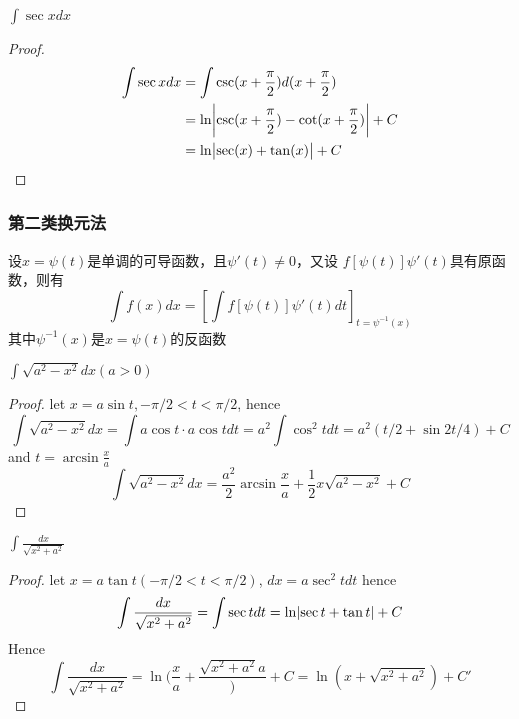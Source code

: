 \documentclass[11pt]{article}
\begin{document}
\begin{proposition}[]
\(\int\sec xdx\)
\end{proposition}

\begin{proof}
\begin{align*}
\int\sec xdx&=\int\csc(x+\frac{\pi}{2})d(x+\frac{\pi}{2})\\
&=\ln\abs{\csc(x+\frac{\pi}{2})-\cot(x+\frac{\pi}{2})}+C\\
&=\ln\abs{\sec(x)+\tan(x)}+C
\end{align*}
\end{proof}
\subsubsection{第二类换元法}
\label{sec:orge5128ed}
\begin{theorem}[]
设\(x=\psi(t)\)是单调的可导函数，且\(\psi'(t)\neq0\)，又设
\(f[\psi(t)]\psi'(t)\)具有原函数，则有
\begin{equation*}
\int f(x)dx=\left[\int f[\psi(t)]\psi'(t)dt\right]_{t=\psi^{-1}(x)}
\end{equation*}
其中\(\psi^{-1}(x)\)是\(x=\psi(t)\)的反函数
\end{theorem}

\begin{proposition}[]
\(\int\sqrt{a^2-x^2}dx(a>0)\)
\end{proposition}

\begin{proof}
let \(x=a\sin t,-\pi/2<t<\pi/2\), hence
\begin{equation*}
\int\sqrt{a^2-x^2}dx=\int a\cos t\cdot a\cos tdt=a^2\int\cos^2tdt=a^2(t/2+\sin2t/4)+C
\end{equation*}
and \(t=\arcsin\frac{x}{a}\)
\begin{equation*}
\int\sqrt{a^2-x^2}dx=\frac{a^2}{2}\arcsin\frac{x}{a}+\frac{1}{2}x\sqrt{a^2-x^2}+C
\end{equation*}
\end{proof}

\begin{proposition}[]
\(\int\frac{dx}{\sqrt{x^2+a^2}}\)
\end{proposition}

\begin{proof}
let \(x=a\tan t(-\pi/2<t<\pi/2)\), \(dx=a\sec^2tdt\)
hence
\begin{equation*}
\int\frac{dx}{\sqrt{x^2+a^2}}=\int\sec tdt=\ln\abs{\sec t+\tan t}+C
\end{equation*}
Hence
\begin{equation*}
\int\frac{dx}{\sqrt{x^2+a^2}}=\ln(\frac{x}{a}+\frac{\sqrt{x^2+a^2}{a}})+C=\ln(x+\sqrt{x^2+a^2})+C'
\end{equation*}
\end{proof}
\end{document}

